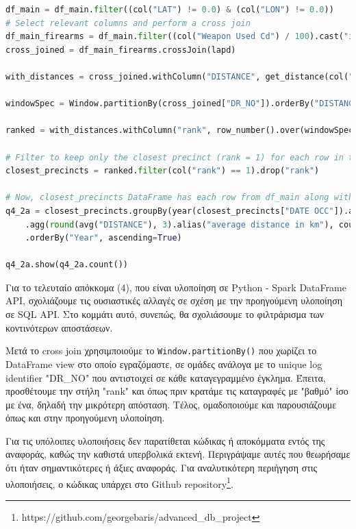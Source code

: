 \documentclass{article}
\begin{document}
\begin{lstlisting}[language=Python, caption={Query 4 2a - DF}]
    df_main = df_main.filter((col("LAT") != 0.0) & (col("LON") != 0.0))
# Select relevant columns and perform a cross join
df_main_firearms = df_main.filter((col("Weapon Used Cd") / 100).cast("int") == 1).select("DR_NO", "LAT", "LON", "DATE OCC", "AREA")
cross_joined = df_main_firearms.crossJoin(lapd)

with_distances = cross_joined.withColumn("DISTANCE", get_distance(col("LAT"), col("LON"), col("Y"), col("X")))

windowSpec = Window.partitionBy(cross_joined["DR_NO"]).orderBy("DISTANCE")

ranked = with_distances.withColumn("rank", row_number().over(windowSpec))

# Filter to keep only the closest precinct (rank = 1) for each row in the main DataFrame
closest_precincts = ranked.filter(col("rank") == 1).drop("rank")

# Now, closest_precincts DataFrame has each row from df_main along with the details of its closest precinct
q4_2a = closest_precincts.groupBy(year(closest_precincts["DATE OCC"]).alias("Year")) \
    .agg(round(avg("DISTANCE"), 3).alias("average distance in km"), count("*").alias("Count")) \
    .orderBy("Year", ascending=True)

q4_2a.show(q4_2a.count())
\end{lstlisting}


Για το τελευταίο απόκκομα (4), που είναι υλοποίηση σε  Python - Spark DataFrame API, σχολιάζουμε τις ουσιαστικές αλλαγές σε σχέση με την προηγούμενη υλοποίηση σε  SQL API. Στο κομμάτι αυτό, συνεπώς, θα σχολιάσουμε το φιλτράρισμα των κοντινότερων αποστάσεων. 


Μετά το  cross join  χρησιμποιούμε το \texttt{Window.partitionBy()}  που χωρίζει το  DataFrame view  στο οποίο εγραζόμαστε, σε ομάδες ανάλογα με το  unique log identifier "DR\_NO"  που αντιστοιχεί σε κάθε καταγεγραμμένο έγκλημα. Έπειτα, προσθέτουμε την στήλη "rank"  και όπως πριν κρατάμε τις καταγραφές με "βαθμό" ίσο με ένα, δηλαδή την μικρότερη απόσταση. Τέλος, ομαδοποιούμε και παρουσιάζουμε όπως και στην προηγούμενη υλοποίηση. 


Για τις υπόλοιπες υλοποιήσεις δεν παρατίθεται κώδικας ή αποκόμματα εντός της αναφοράς, καθώς την καθιστά υπερβολικά εκτενή. Περιγράψαμε αυτές που θεωρήσαμε ότι ήταν σημαντικότερες ή άξιες αναφοράς. Για αναλυτικότερη περιήγηση στις υλοποιήσεις, ο κώδικας υπάρχει στο Github repository\footnote{https://github.com/georgebaris/advanced\_db\_project}.
\end{document}
